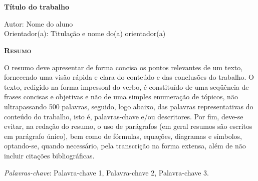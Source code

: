 \chapter*{}
\begin{center}
	{\Large{\textbf{Título do trabalho}}}
\end{center}

\vspace{1cm}

\begin{flushright}
	Autor: Nome do aluno\\
	Orientador(a): Titulação e nome do(a) orientador(a)
\end{flushright}

\vspace{1cm}

\begin{center}
	\Large{\textsc{\textbf{Resumo}}}
\end{center}

\noindent O resumo deve apresentar de forma concisa os pontos relevantes de um texto, fornecendo uma visão rápida e clara do conteúdo e das conclusões do trabalho. O texto, redigido na forma impessoal do verbo, é constituído de uma seqüência de frases concisas e objetivas e não de uma simples enumeração de tópicos, não ultrapassando 500 palavras, seguido, logo abaixo, das palavras representativas do conteúdo do trabalho, isto é, palavras-chave e/ou descritores. Por fim, deve-se evitar, na redação do resumo, o uso de parágrafos (em geral resumos são escritos em parágrafo único), bem como de fórmulas, equações, diagramas e símbolos, optando-se, quando necessário, pela transcrição na forma extensa, além de não incluir citações bibliográficas.

\noindent\textit{Palavras-chave}: Palavra-chave 1, Palavra-chave 2, Palavra-chave 3.